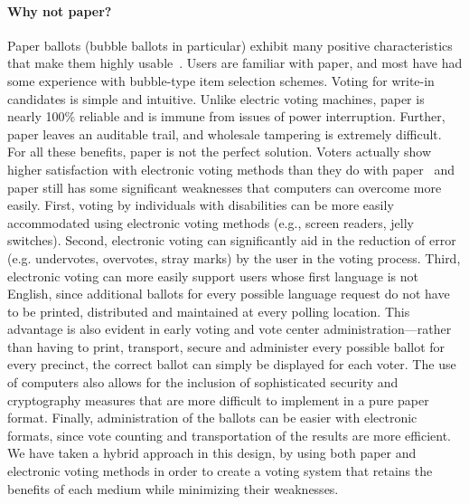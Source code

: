 \paragraph{Why not paper?}
Paper ballots (bubble ballots in particular) exhibit many positive characteristics that make them highly usable~\cite{hfes-06,byrne-baseline}. Users are familiar with paper, and most have had some experience with bubble-type item selection schemes. Voting for write-in candidates is simple and intuitive. Unlike electric voting machines, paper is nearly 100\% reliable and is immune from issues of power interruption. Further, paper leaves an auditable trail, and wholesale tampering is extremely difficult. 
For all these benefits, paper is not the perfect solution. Voters actually show higher satisfaction with electronic voting methods than they do with paper~\cite{everett08chi-dre-usability} and paper still has some significant weaknesses that computers can overcome more easily. First, voting by individuals with disabilities can be more easily accommodated using electronic voting methods (e.g., screen readers, jelly switches). Second, electronic voting can significantly aid in the reduction of error (e.g. undervotes, overvotes, stray marks) by the user in the voting process. Third, electronic voting can more easily support users whose first language is not English, since additional ballots for every possible language request do not have to be printed, distributed and maintained at every polling location. This advantage is also evident in early voting and vote center administration---rather than having to print, transport, secure and administer every possible ballot for every precinct, the correct ballot can simply be displayed for each voter. The use of computers also allows for the inclusion of sophisticated security and cryptography measures that are more difficult to implement in a pure paper format. Finally, administration of the ballots can be easier with electronic formats, since vote counting and transportation of the results are more efficient.
We have taken a hybrid approach in this design, by using both paper and electronic voting methods in order to create a voting system that retains the benefits of each medium while minimizing their weaknesses. 
